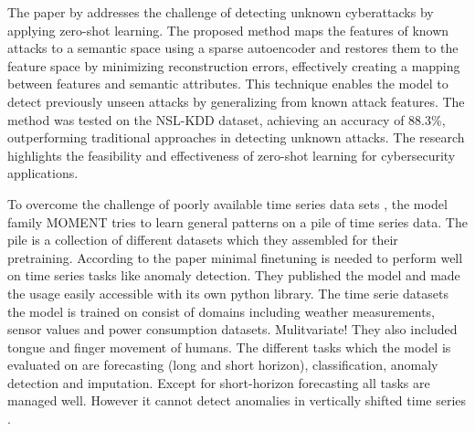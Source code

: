 The paper by  addresses the challenge of detecting unknown cyberattacks by applying zero-shot learning. The proposed method maps the features of known attacks to a semantic space using a sparse autoencoder and restores them to the feature space by minimizing reconstruction errors, effectively creating a mapping between features and semantic attributes. This technique enables the model to detect previously unseen attacks by generalizing from known attack features. The method was tested on the NSL-KDD dataset, achieving an accuracy of 88.3\%, outperforming traditional approaches in detecting unknown attacks. The research highlights the feasibility and effectiveness of zero-shot learning for cybersecurity applications.











To overcome the challenge of poorly available time series data sets , the model family MOMENT tries to learn general patterns on a pile of time series data. The pile is a collection of different datasets which they assembled for their pretraining. According to the paper minimal finetuning is needed to perform well on time series tasks like anomaly detection. They published the model and made the usage easily accessible with its own python library. The time serie datasets the model is trained on consist of domains including weather measurements, sensor values and power consumption datasets. Mulitvariate! They also included tongue and finger movement of humans. The different tasks which the model is evaluated on are forecasting (long and short horizon), classification, anomaly detection and imputation. Except for short-horizon forecasting all tasks are managed well. However it cannot detect anomalies in vertically shifted time series .

